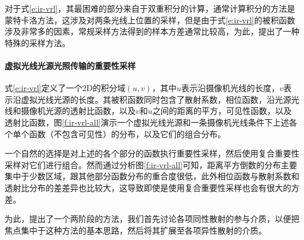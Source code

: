 对于式\ref{e:ir-vrl}，其最困难的部分来自于双重积分的计算，通常计算积分的方法是蒙特卡洛方法，这涉及对两条光线上位置的采样，但是由于式\ref{e:ir-vrl}的被积函数涉及非常多的因素，常规采样方法得到的样本方差通常比较高，为此，\cite{a:VirtualRayLightsforRenderingSceneswithParticipatingMedia}提出了一种特殊的采样方法。




\paragraph{虚拟光线光源光照传输的重要性采样}
式\ref{e:ir-vrl}定义了一个2D的积分域$(u,v)$，其中$u$表示沿摄像机光线的长度，$v$表示沿虚拟光线光源的长度。其被积函数同时包含了散射系数，相位函数，沿光源光线和摄像机光源的透射比函数，以及$v$和$u$之间的距离的平方，可见性函数，以及透射比函数，图\ref{f:ir-vrl-all}演示一个虚拟光线光源和一条摄像机光线条件下上述各个单个函数（不包含可见性）的分布，以及它们的组合分布。

一个自然的选择是对上述的各个部分的函数执行重要性采样，然后使用复合重要性采样对它们进行组合。然而通过分析图\ref{f:ir-vrl-all}可知，距离平方倒数的分布主要集中于少数区域，跟其他部分函数分布的重合度很低，此外相位函数与散射系数和透射比分布的差差异也比较大，这导致即使是使用复合重要性采样也会有很大的方差。

为此，\cite{a:VirtualRayLightsforRenderingSceneswithParticipatingMedia}提出了一个两阶段的方法，我们首先讨论各项同性散射的参与介质，以便把焦点集中于这种方法的基本思路，然后将其扩展至各项异性散射的介质。

